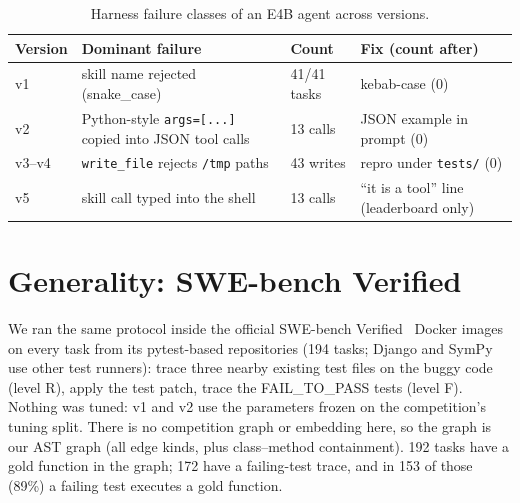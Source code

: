 \documentclass[10pt]{article}
\newcommand{\code}[1]{\texttt{#1}}
\begin{document}
\begin{table}[h]
\centering\small
\begin{tabular}{llll}
\toprule
Version & Dominant failure & Count & Fix (count after) \\
\midrule
v1 & skill name rejected (snake\_case) & 41/41 tasks & kebab-case (0) \\
v2 & Python-style \code{args=[...]} copied into JSON tool calls & 13 calls & JSON example in prompt (0) \\
v3--v4 & \code{write\_file} rejects \code{/tmp} paths & 43 writes & repro under \code{tests/} (0) \\
v5 & skill call typed into the shell & 13 calls & ``it is a tool'' line (leaderboard only) \\
\bottomrule
\end{tabular}
\caption{Harness failure classes of an E4B agent across versions.}
\label{tab:e4}
\end{table}

\section{Generality: SWE-bench Verified}
\label{sec:swebench}

We ran the same protocol inside the official SWE-bench Verified~\cite{jimenez2024swebench} Docker images on every task
from its pytest-based repositories (194 tasks; Django and SymPy use other test runners): trace three nearby existing
test files on the buggy code (level R), apply the test patch, trace the FAIL\_TO\_PASS tests (level F). Nothing was
tuned: v1 and v2 use the parameters frozen on the competition's tuning split. There is no competition graph or
embedding here, so the graph is our AST graph (all edge kinds, plus class--method containment). 192 tasks have a gold
function in the graph; 172 have a failing-test trace, and in 153 of those (89\%) a failing test executes a gold
function.
\end{document}
